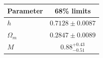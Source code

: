 \begin{tabular} { l  c}

 Parameter &  68\% limits\\
\hline
{\boldmath$h              $} & $0.7128\pm 0.0087          $\\

{\boldmath$Ω_m            $} & $0.2847\pm 0.0089          $\\

{\boldmath$M              $} & $0.88^{+0.43}_{-0.51}      $\\
\hline
\end{tabular}